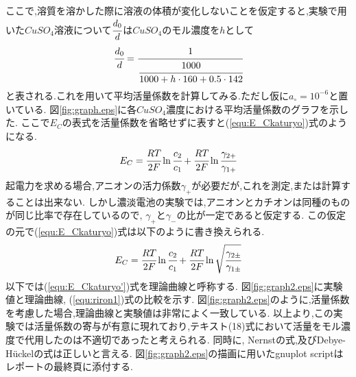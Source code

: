 ここで,溶質を溶かした際に溶液の体積が変化しないことを仮定すると,実験で用いた$CuSO_4$溶液について$\cfrac{d_0}{d}$は$CuSO_4$のモル濃度を$h$として
\begin{equation}
  \label{equ:h}
  \cfrac{d_0}{d}=\cfrac{1}{\cfrac{1000}{1000+h\cdot160+0.5\cdot142}}
\end{equation}
と表される.これを用いて平均活量係数を計算してみる.ただし仮に$a_{\circ}=10^{-6}$と置いている.
図\ref{fig:graph.eps}に各$CuSO_4$濃度における平均活量係数のグラフを示した.
ここで$E_C$の表式を活量係数を省略せずに表すと(\ref{equ:E_Ckaturyo})式のようになる.
\begin{equation}
  \label{equ:E_Ckaturyo}
  E_C=\cfrac{RT}{2F}\ln \cfrac{c_2}{c_1} + \cfrac{RT}{2F}\ln \cfrac{\gamma_{2+}}{\gamma_{1+}}
\end{equation}
起電力を求める場合,アニオンの活力係数$\gamma_+$が必要だが,これを測定,または計算することは出来ない\cite{kakiuchi2016}.
しかし濃淡電池の実験では,アニオンとカチオンは同種のものが同じ比率で存在しているので, $\gamma_{+}$と$\gamma_{-}$の比が一定であると仮定する.
この仮定の元で(\ref{equ:E_Ckaturyo})式は以下のように書き換えられる.
\begin{equation}
  \label{equ:E_Ckaturyo'}
  E_C=\cfrac{RT}{2F}\ln \cfrac{c_2}{c_1} + \cfrac{RT}{2F}\ln \sqrt{\cfrac{\gamma_{2\pm}}{\gamma_{1\pm}}}
\end{equation}
以下では(\ref{equ:E_Ckaturyo'})式を理論曲線と呼称する.
図\ref{fig:graph2.eps}に実験値と理論曲線, (\ref{equ:riron1})式の比較を示す.
図\ref{fig:graph2.eps}のように,活量係数を考慮した場合,理論曲線と実験値は非常によく一致している.
以上より,この実験では活量係数の寄与が有意に現れており,テキスト(18)式において活量をモル濃度で代用したのは不適切であったと考えられる.
同時に, Nernstの式,及びDebye-H\"{u}ckelの式は正しいと言える.
図\ref{fig:graph2.eps}の描画に用いたgnuplot scriptはレポートの最終頁に添付する.

